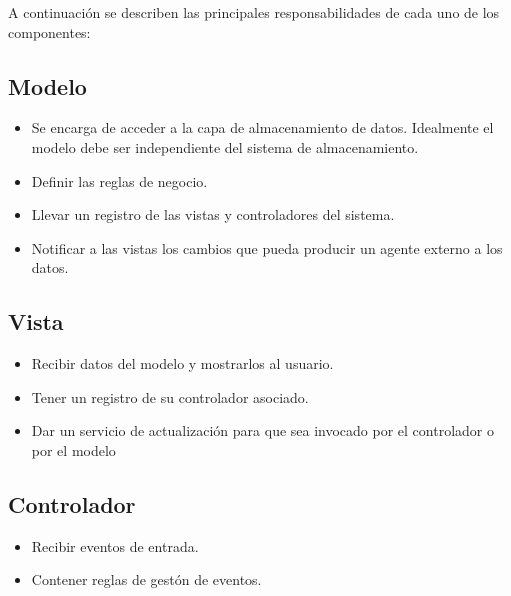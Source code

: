 \newpage
A continuación se describen las principales responsabilidades de cada uno de los componentes: 

\subsection{Modelo}
\begin{itemize}
	\item Se encarga de acceder a la capa de almacenamiento de datos. Idealmente el modelo debe ser independiente del sistema de almacenamiento. 
	
	\item Definir las reglas de negocio.
	
	\item Llevar un registro de las vistas y controladores del sistema.
	
	\item Notificar a las vistas los cambios que pueda producir un agente externo a los datos.
\end{itemize}

\subsection{Vista}
\begin{itemize}
	\item Recibir datos del modelo y mostrarlos al usuario.
	
	\item Tener un registro de su controlador asociado.
	
	\item Dar un servicio de actualización para que sea invocado por el controlador o por el modelo
\end{itemize}

\subsection{Controlador}
\begin{itemize}
	\item Recibir eventos de entrada.
	
	\item Contener reglas de gestón de eventos.
\end{itemize}

